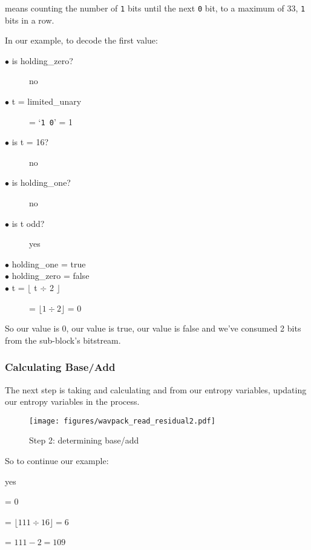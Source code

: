  means counting the number
of \texttt{1} bits until the next \texttt{0} bit, to a maximum
of 33, \texttt{1} bits in a row.

In our example, to decode the first  value:
\begin{description}
\item[$\bullet$ is holding\_zero?] no
\item[$\bullet$ t = limited\_unary] = `\texttt{1 0}' = 1
\item[$\bullet$ is t = 16?] no
\item[$\bullet$ is holding\_one?] no
\item[$\bullet$ is t odd?] yes
\item[$\bullet$ holding\_one = true]
\item[$\bullet$ holding\_zero = false]
\item[$\bullet$ t = $\lfloor$ t $\div$ 2 $\rfloor$] = $\lfloor 1 \div 2 \rfloor$ = 0
\end{description}
So our  value is 0, our  value is true,
our  value is false and we've
consumed 2 bits from the sub-block's bitstream.

\clearpage

\subsubsection{Calculating Base/Add}
The next step is taking  and calculating  and 
from our entropy variables, updating our entropy variables in the process.
\begin{figure}[h]
\texttt{[image: figures/wavpack\_read\_residual2.pdf]}
\caption{Step 2: determining base/add}
\end{figure}
\par
\noindent
So to continue our example:
\begin{description}
\setlength{\itemsep}{0pt}
\item[$\bullet$ is t = 0?] yes
\item[$\bullet$ base] = 0
\item[$\bullet$ add = $\lfloor \text{Entropy}_1 \div 16 \rfloor$] = $\lfloor 111 \div 16 \rfloor = 6$
\item[$\bullet$ $\text{Entropy}_1$ = $\text{Entropy}_1 - \lfloor(\text{Entropy}_1 + 126) \div 128\rfloor \times 2$] = $111 - 2 = 109$
\end{description}

